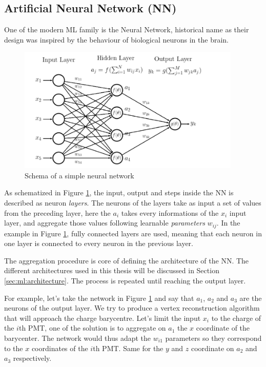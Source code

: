 \documentclass[../main.tex]{subfiles}
\begin{document}
\subsection{Artificial Neural Network (NN)}
\label{sec:ml:nn}

One of the modern ML family is the Neural Network, historical name as their design was inspired by the behaviour of biological neurons in the brain.
\begin{figure}[ht]
  \centering
  \includegraphics[height=6cm]{images/ml/nn_explications.png}
  \caption{Schema of a simple neural network}
  \label{fig:ml:schema_nn}
\end{figure}
As schematized in Figure \ref{fig:ml:schema_nn}, the input, output and steps inside the NN is described as neuron \textit{layers}. The neurons of the layers take as input a set of values from the preceding layer, here the $a_i$ takes every informations of the $x_i$ input layer, and aggregate those values following learnable \textit{parameters} $w_{ij}$. In the example in Figure \ref{fig:ml:schema_nn}, fully connected layers are used, meaning that each neuron in one layer is connected to every neuron in the previous layer.

The aggregation procedure is core of defining the architecture of the NN. The different architectures used in this thesis will be discussed in Section \ref{sec:ml:architecture}. The process is repeated until reaching the output layer.

For example, let's take the network in Figure \ref{fig:ml:schema_nn} and say that $a_1$, $a_2$ and $a_3$ are the neurons of the output layer. We try to produce a vertex reconstruction algorithm that will approach the charge barycentre. Let's limit the input $x_i$ to the charge of the $i$th PMT, one of the solution is to aggregate on $a_1$ the $x$ coordinate of the barycenter. The network would thus adapt the $w_{i1}$ parameters so they correspond to the $x$ coordinates of the $i$th PMT. Same for the $y$ and $z$ coordinate on $a_2$ and $a_3$ respectively.
\end{document}
